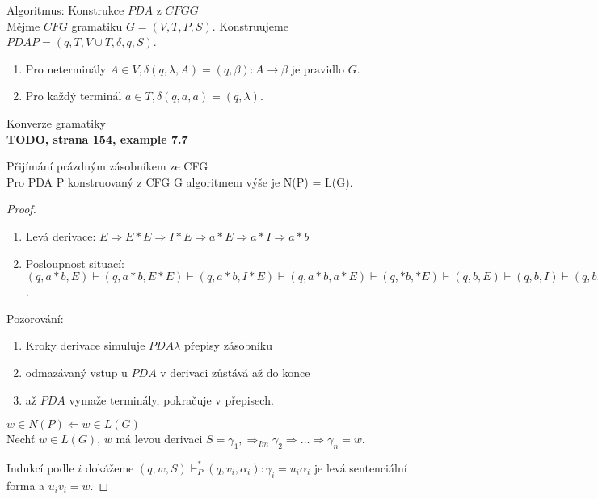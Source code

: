\documentclass[../main.tex]{subfiles}
\begin{document}
    \begin{theorem}
        Algoritmus: Konstrukce $PDA$ z $CFG G$\\

        Mějme $CFG$ gramatiku $G = (V,T,P,S)$. Konstruujeme $PDA P = ({q}, T,V\cup T, \delta, q,S)$.
        \begin{enumerate}
            \item Pro neterminály $A \in V, \delta(q,\lambda, A) = {(q,\beta) : A \rightarrow \beta \text{ je pravidlo }G}$.
            \item Pro každý terminál $a \in T, \delta(q,a,a) = {(q,\lambda)}$.
        \end{enumerate}
    \end{theorem}
    \begin{example}
        Konverze gramatiky\\

        \textbf{TODO, strana 154, example 7.7}
    \end{example}

    \begin{theorem}
        Přijímání prázdným zásobníkem ze CFG\\

        Pro PDA P konstruovaný z CFG G algoritmem výše je N(P) = L(G).\\
        \begin{proof}
            \begin{enumerate}
                \item Levá derivace: $E \Rightarrow E * E \Rightarrow I * E \Rightarrow a*E \Rightarrow a*I \Rightarrow a*b$
                \item Posloupnost situací: $(q,a*b,E)\vdash (q,a*b,E*E)\vdash (q,a*b,I*E)\vdash (q,a*b,a*E)\vdash (q,*b,*E)\vdash(q,b,E)\vdash(q,b,I)\vdash(q,b,b)\vdash(q,\lambda,\lambda)$.
            \end{enumerate}    

            Pozorování:
            \begin{enumerate}
                \item Kroky derivace simuluje $PDA \lambda$ přepisy zásobníku
                \item odmazávaný vstup u $PDA$ v derivaci zůstává až do konce
                \item až $PDA$ vymaže terminály, pokračuje v přepisech.
            \end{enumerate}


            $w\in N(P) \Leftarrow w\in L(G)$\\

            Nechť $w\in L(G)$, $w$ má levou derivaci $S = \gamma_1, \Rightarrow_{Im} \gamma_2 \Rightarrow \dots \Rightarrow \gamma_n = w.$

            Indukcí podle $i$ dokážeme $(q,w,S)\vdash^*_P (q,v_i,\alpha_i) : \gamma_i = u_i \alpha_i$ je levá sentenciální forma a $u_iv_i = w$.
        \end{proof}
    \end{theorem}
\end{document}
